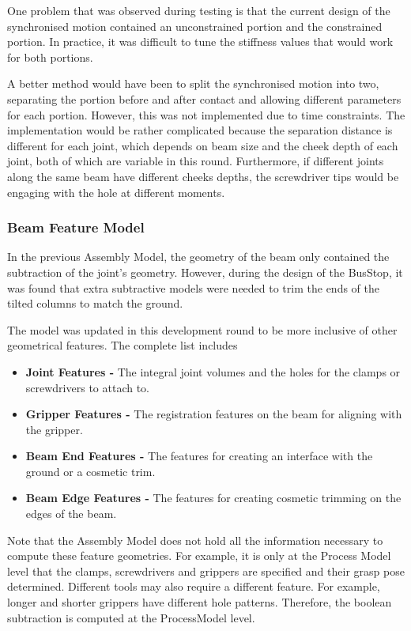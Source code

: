 \documentclass[11pt]{book}
\begin{document}
One problem that was observed during testing is that the current design of the synchronised motion contained an unconstrained portion and the constrained portion. In practice, it was difficult to tune the stiffness values that would work for both portions. 

A better method would have been to split the synchronised motion into two, separating the portion before and after contact and allowing different parameters for each portion. However, this was not implemented due to time constraints. The implementation would be rather complicated because the separation distance is different for each joint, which depends on beam size and the cheek depth of each joint, both of which are variable in this round. Furthermore, if different joints along the same beam have different cheeks depths, the screwdriver tips would be engaging with the hole at different moments. 

\subsubsection{Beam Feature Model}

In the previous Assembly Model, the geometry of the beam only contained the subtraction of the joint's geometry. However, during the design of the BusStop, it was found that extra subtractive models were needed to trim the ends of the tilted columns to match the ground.

The model was updated in this development round to be more inclusive of other geometrical features. The complete list includes

\begin{itemize}
	\item \textbf{Joint Features - }The integral joint volumes and the holes for the clamps or screwdrivers to attach to. 

	\item \textbf{Gripper Features - }The registration features on the beam for aligning with the gripper.

	\item \textbf{Beam End Features -} The features for creating an interface with the ground or a cosmetic trim.

	\item \textbf{Beam Edge Features - }The features for creating cosmetic trimming on the edges of the beam.

\end{itemize}
Note that the Assembly Model does not hold all the information necessary to compute these feature geometries. For example, it is only at the Process Model level that the clamps, screwdrivers and grippers are specified and their grasp pose determined. Different tools may also require a different feature. For example, longer and shorter grippers have different hole patterns. Therefore, the boolean subtraction is computed at the ProcessModel level.
\end{document}
